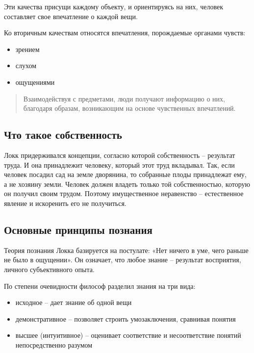 \documentclass[a4paper, 14pt]{extreport}
\begin{document}
Эти качества присущи каждому объекту, и ориентируясь на них, человек
составляет свое впечатление о каждой вещи.

Ко вторичным качествам относятся впечатления, порождаемые органами
чувств:

\begin{itemize}

\item
  зрением
\item
  слухом
\item
  ощущениями
\end{itemize}

\begin{quote}
Взаимодействуя с предметами, люди получают информацию о них, благодаря
образам, возникающим на основе чувственных впечатлений.
\end{quote}

\subsection{Что такое собственность}

Локк придерживался концепции, согласно которой собственность --
результат труда. И она принадлежит человеку, который этот труд
вкладывал. Так, если человек посадил сад на земле дворянина, то
собранные плоды принадлежат ему, а не хозяину земли. Человек должен
владеть только той собственностью, которую он получил своим трудом.
Поэтому имущественное неравенство -- естественное явление и искоренить
его не получиться.

\subsection{Основные принципы познания}

Теория познания Локка базируется на постулате: «Нет ничего в уме, чего
раньше не было в ощущении». Он означает, что любое знание -- результат
восприятия, личного субъективного опыта.

По степени очевидности философ разделил знания на три вида:

\begin{itemize}

\item
  исходное -- дает знание об одной вещи
\item
  демонстративное -- позволяет строить умозаключения, сравнивая понятия
\item
  высшее (интуитивное) -- оценивает соответствие и несоответствие
  понятий непосредственно разумом
\end{itemize}
\end{document}

